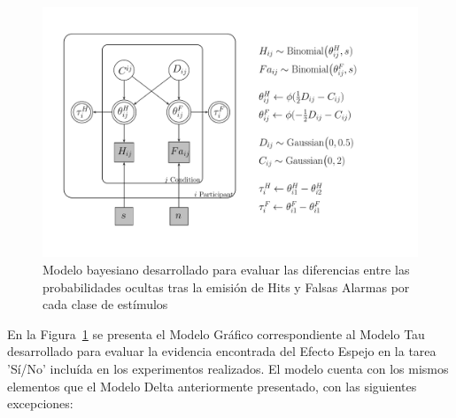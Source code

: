\begin{figure}[h]
\centering
\includegraphics[width=1.1\textwidth]{Figures/Model_Tau_Diff_Tetas}
\decoRule
\caption[Modelo Tau: Modelo Bayesiano para evaluar las diferencias entre las $\theta$ de Hits y Falsas Alarmas de cada clase de estímulos]{Modelo bayesiano desarrollado para evaluar las diferencias entre las probabilidades ocultas tras la emisión de Hits y Falsas Alarmas por cada clase de estímulos}
\label{fig:Mod_Tau}
\end{figure}

En la Figura~\ref{fig:Mod_Tau} se presenta el Modelo Gráfico correspondiente al Modelo Tau desarrollado para evaluar la evidencia encontrada del Efecto Espejo en la tarea 'Sí/No' incluída en los experimentos realizados. El modelo cuenta con los mismos elementos que el Modelo Delta anteriormente presentado, con las siguientes excepciones:\\


